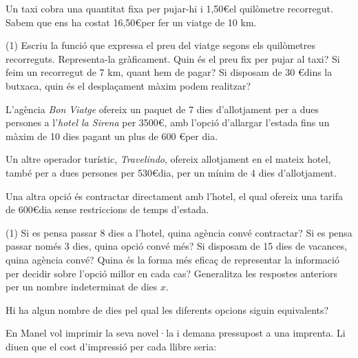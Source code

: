 \newpage

\begin{extrapage}

	Un taxi cobra una quantitat fixa per pujar-hi i 1,50\euro el quilòmetre recorregut. Sabem que ens ha
	costat 16,50\euro per fer un viatge de 10 km.

	\begin{tasks}(1)
		\task Escriu la funció que expressa el preu del viatge segons els quilòmetres recorreguts. 
			 Representa-la gràficament.
		\task Quin és el preu fix per pujar al taxi?
		\task Si feim un recorregut de 7 km, quant hem de pagar?
		\task Si disposam de 30 \euro dins la butxaca, quin és el desplaçament màxim podem realitzar?
	\end{tasks}

	\vspace{0.5cm}

	
	L'agència \textit{Bon Viatge}  ofereix un paquet de 7 dies d'allotjament per a dues persones a 
	l'\textit{hotel la Sirena} per 3500\euro, amb l'opció d'allargar l'estada fins un màxim de 10 dies 
	pagant un plus de 600 \euro per dia.
	
	Un altre operador turístic, \textit{Travelindo}, ofereix allotjament en el mateix hotel, 
	també per a dues persones per 530\euro dia, per un mínim de 4 dies d'allotjament.

	Una altra opció és contractar directament amb l'hotel, el qual ofereix una tarifa de 600\euro dia sense 
	restriccions de temps d'estada.

	\begin{tasks}(1)
		\task Si es pensa passar 8 dies a l'hotel, quina agència convé contractar?
		\task Si es pensa passar només 3 dies, quina opció convé més?
		\task Si disposam de 15 dies de vacances, quina agència convé?
		\task Quina és la forma més eficaç de representar la informació per decidir sobre
			  l'opció millor en cada cas? Generalitza les respostes anteriors per un nombre 
			  indeterminat de dies $x$.

		\task Hi ha algun nombre de dies pel qual les diferents opcions siguin equivalents? 
	\end{tasks}

	\vspace{0.5cm}

	
	En Manel vol imprimir la seva novel·la i demana pressupost a una imprenta. Li diuen que el cost 
	d'impressió per cada llibre seria:
	

\end{extrapage}
